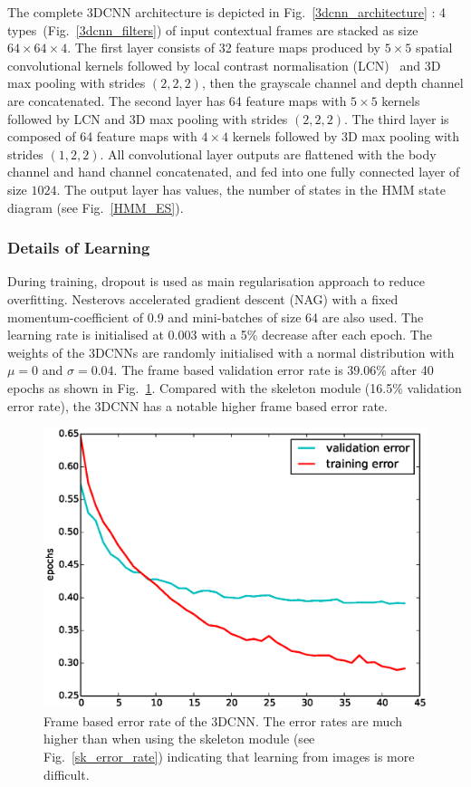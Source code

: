 The complete 3DCNN architecture is depicted in Fig.~\ref{3dcnn_architecture} : 4 types~(Fig.~\ref{3dcnn_filters}) of input contextual frames are stacked as size $64\times64\times4$.
The first layer consists of 32 feature maps produced by $5\times5$ spatial convolutional kernels followed by local contrast normalisation (LCN)~\cite{jarrett2009best} and 3D max pooling with strides $(2,2,2)$, then the grayscale channel and depth channel are concatenated. The second layer has 64 feature maps with $5\times5$ kernels followed by LCN and 3D max pooling with strides $(2,2,2)$. The third layer is composed of 64 feature maps with $4\times4$ kernels followed by 3D max pooling with strides $(1,2,2)$. All convolutional layer outputs are flattened with the body channel and hand channel concatenated, and fed into one fully connected layer of size $1024$. 
%
The output layer has \numberhiddenstates{} values, the number of states in the HMM state diagram (see Fig.~\ref{HMM_ES}).




\subsubsection{Details of Learning}
During training, dropout \cite{hinton2012improving} is used as main regularisation approach to reduce overfitting. Nesterovs accelerated gradient descent (NAG) \cite{sutskever2013importance} with a fixed momentum-coefficient of 0.9 and mini-batches of size 64 are also used.
The learning rate is initialised at 0.003 with a 5\% decrease after each epoch. The weights of the 3DCNNs are randomly initialised with a normal distribution with $\mu = 0$ and $\sigma = 0.04$.
The frame based validation error rate is $39.06\%$ after 40 epochs as shown in Fig.~\ref{fig:RGBErrorRate}. 
Compared with the skeleton module (16.5\% validation error rate), the 3DCNN has a notable higher frame based error rate.


\begin{figure}[t]
  \centering
  \includegraphics[width=.4\textwidth]{images/3dcnn_filters/training_error}
  \caption{Frame based error rate of the 3DCNN. 
 The error rates are much higher than when using the skeleton module (see Fig.~\ref{sk_error_rate})
 indicating that  learning from images is more difficult. }
\label{fig:RGBErrorRate}
\end{figure}


